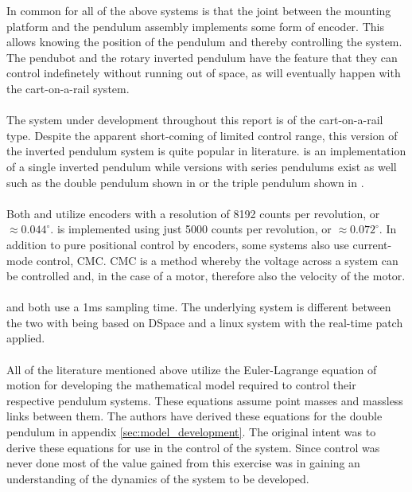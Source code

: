 In common for all of the above systems is that the joint between the mounting platform and the pendulum assembly implements some form of encoder.
This allows knowing the position of the pendulum and thereby controlling the system.
The pendubot and the rotary inverted pendulum have the feature that they can control indefinetely without running out of space, as will eventually happen with the cart-on-a-rail system.
\\~\\
The system under development throughout this report is of the cart-on-a-rail type.
Despite the apparent short-coming of limited control range, this version of the inverted pendulum system is quite popular in literature.
\cite{invertpendulum3} is an implementation of a single inverted pendulum while versions with series pendulums exist as well such as the double pendulum shown in \cite{doubleinvertpendulum} or the triple pendulum shown in \cite{tripleinvertpendulum}.
\\~\\
Both \cite{doubleinvertpendulum} and \cite{tripleinvertpendulum} utilize encoders with a resolution of 8192 counts per revolution, or $\approx 0.044^\circ$.
\cite{invertpendulum3} is implemented using just 5000 counts per revolution, or $\approx 0.072^\circ$.
In addition to pure positional control by encoders, some systems \cite{invertpendulum1} also use current-mode control, CMC.
CMC is a method whereby the voltage across a system can be controlled and, in the case of a motor, therefore also the velocity of the motor.
\\~\\
\cite{doubleinvertpendulum} and \cite{tripleinvertpendulum} both use a 1ms sampling time.
The underlying system is different between the two with \cite{tripleinvertpendulum} being based on DSpace and \cite{doubleinvertpendulum} a linux system with the real-time patch applied.
\\~\\
All of the literature mentioned above utilize the Euler-Lagrange equation of motion for developing the mathematical model required to control their respective pendulum systems. 
These equations assume point masses and massless links between them.
The authors have derived these equations for the double pendulum in appendix \ref{sec:model_development}.
The original intent was to derive these equations for use in the control of the system.
Since control was never done most of the value gained from this exercise was in gaining an understanding of the dynamics of the system to be developed.

